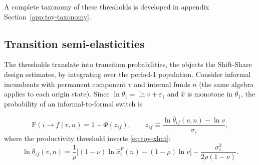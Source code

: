\documentclass[12pt]{article}
\begin{document}

A complete taxonomy of these thresholds is developed in appendix Section~\ref{app:toy-taxonomy}.

\subsection{Transition semi-elasticities}

The thresholds translate into transition probabilities, the objects the Shift-Share design estimates, by integrating over the period-1 population. Consider informal incumbents with permanent component $v$ and internal funds $n$ (the same algebra applies to each origin state). Since $\ln\theta_{1}=\ln v+\varepsilon_{1}$ and $\hat x$ is monotone in $\theta_{1}$, the probability of an informal-to-formal switch is

\begin{equation}
  \mathbb{P}(i\to f \mid v,n)
  = 1-\Phi\!\left(z_{if}\right),
  \qquad
  z_{if} \equiv\frac{\ln\bar{\theta}_{if}(v,n)-\ln v}{\sigma_{\varepsilon}},
  \label{eq:toy-Pif}
\end{equation}
where the productivity threshold inverts \eqref{eq:toy-xhat}:
\begin{equation}
  \ln\bar{\theta}_{if}(v,n)
  = \frac{1}{\rho}\Big[(1-\nu)\ln \hat x^F_{i}(n)
  - (1-\rho)\ln v\Big]
  - \frac{\sigma_{\varepsilon}^{2}}{2\rho(1-\nu)} .
  \label{eq:toy-thbar}
\end{equation}
\end{document}
